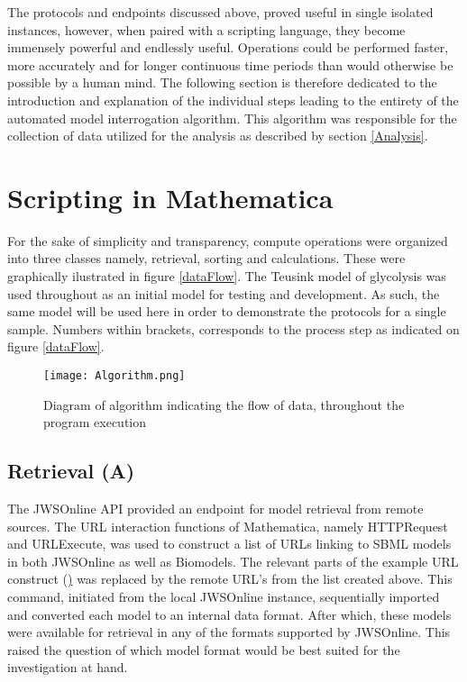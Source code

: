 The protocols and endpoints discussed above, proved useful in single isolated instances, however, when paired with a scripting language, they become immensely powerful and endlessly useful. Operations could be performed faster, more accurately and for longer continuous time periods than would otherwise be possible by a human mind. The following section is therefore dedicated to the introduction and explanation of the individual steps leading to the entirety of the automated model interrogation algorithm. This algorithm was responsible for the collection of data utilized for the analysis as described by section \ref{Analysis}.

\section{Scripting in Mathematica} \label{Scripting in Mathematica}

For the sake of simplicity and transparency, compute operations were organized into three classes namely, retrieval, sorting and calculations. These were graphically ilustrated in figure \ref{dataFlow}. The Teusink model of glycolysis was used throughout as an initial model for testing and development. As such, the same model will be used here in order to demonstrate the protocols for a single sample. Numbers within brackets, corresponds to the process step as indicated on figure \ref{dataFlow}. 

\begin{figure}[p] \label{dataFlow}
\texttt{[image: Algorithm.png]}
\centering
\caption{Diagram of algorithm indicating the flow of data, throughout the program execution}
\label{fig:Algorithm}
\end{figure}

\subsection{Retrieval (A)} \label{Retrieval}
The JWSOnline API provided an endpoint for model retrieval from remote sources. The URL interaction functions of Mathematica, namely HTTPRequest and URLExecute, was used to construct a list of URLs linking to SBML models in both JWSOnline as well as Biomodels. The relevant parts of the example URL construct (\href{http://jjj.bio.vu.nl/rest/fetch/?type={type}&redirect={redirect}&remote={remote}}) was replaced by the remote URL's from the list created above. This command, initiated from the local JWSOnline instance, sequentially imported and converted each model to an internal data format. After which, these models were available for retrieval in any of the formats supported by JWSOnline. This raised the question of which model format would be best suited for the investigation at hand.



